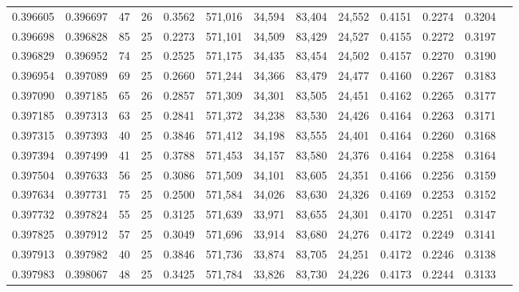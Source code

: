\begin{tabular}{rrrrrrrrrrrrr}
0.396605 & 0.396697 &    47 &  26 &                                     0.3562 & 571,016 &  34,594 &  83,404 &  24,552 & 0.4151 & 0.2274 & 0.3204 \\
0.396698 & 0.396828 &    85 &  25 &                                     0.2273 & 571,101 &  34,509 &  83,429 &  24,527 & 0.4155 & 0.2272 & 0.3197 \\
0.396829 & 0.396952 &    74 &  25 &                                     0.2525 & 571,175 &  34,435 &  83,454 &  24,502 & 0.4157 & 0.2270 & 0.3190 \\
0.396954 & 0.397089 &    69 &  25 &                                     0.2660 & 571,244 &  34,366 &  83,479 &  24,477 & 0.4160 & 0.2267 & 0.3183 \\
0.397090 & 0.397185 &    65 &  26 &                                     0.2857 & 571,309 &  34,301 &  83,505 &  24,451 & 0.4162 & 0.2265 & 0.3177 \\
0.397185 & 0.397313 &    63 &  25 &                                     0.2841 & 571,372 &  34,238 &  83,530 &  24,426 & 0.4164 & 0.2263 & 0.3171 \\
0.397315 & 0.397393 &    40 &  25 &                                     0.3846 & 571,412 &  34,198 &  83,555 &  24,401 & 0.4164 & 0.2260 & 0.3168 \\
0.397394 & 0.397499 &    41 &  25 &                                     0.3788 & 571,453 &  34,157 &  83,580 &  24,376 & 0.4164 & 0.2258 & 0.3164 \\
0.397504 & 0.397633 &    56 &  25 &                                     0.3086 & 571,509 &  34,101 &  83,605 &  24,351 & 0.4166 & 0.2256 & 0.3159 \\
0.397634 & 0.397731 &    75 &  25 &                                     0.2500 & 571,584 &  34,026 &  83,630 &  24,326 & 0.4169 & 0.2253 & 0.3152 \\
0.397732 & 0.397824 &    55 &  25 &                                     0.3125 & 571,639 &  33,971 &  83,655 &  24,301 & 0.4170 & 0.2251 & 0.3147 \\
0.397825 & 0.397912 &    57 &  25 &                                     0.3049 & 571,696 &  33,914 &  83,680 &  24,276 & 0.4172 & 0.2249 & 0.3141 \\
0.397913 & 0.397982 &    40 &  25 &                                     0.3846 & 571,736 &  33,874 &  83,705 &  24,251 & 0.4172 & 0.2246 & 0.3138 \\
0.397983 & 0.398067 &    48 &  25 &                                     0.3425 & 571,784 &  33,826 &  83,730 &  24,226 & 0.4173 & 0.2244 & 0.3133 \\

\end{tabular}
